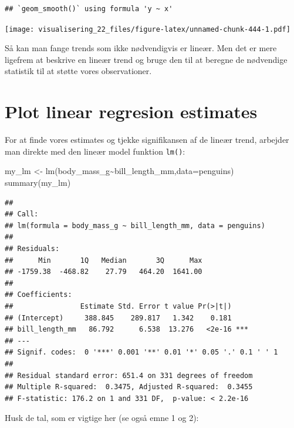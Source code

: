\documentclass[
]{book}
\newenvironment{Shaded}{\begin{snugshade}}{\end{snugshade}}
\newcommand{\AttributeTok}[1]{\textcolor[rgb]{0.77,0.63,0.00}{#1}}
\newcommand{\FunctionTok}[1]{\textcolor[rgb]{0.00,0.00,0.00}{#1}}
\newcommand{\NormalTok}[1]{#1}
\newcommand{\OtherTok}[1]{\textcolor[rgb]{0.56,0.35,0.01}{#1}}
\newcommand{\SpecialCharTok}[1]{\textcolor[rgb]{0.00,0.00,0.00}{#1}}
\begin{document}
\begin{verbatim}
## `geom_smooth()` using formula 'y ~ x'
\end{verbatim}

\texttt{[image: visualisering\_22\_files/figure-latex/unnamed-chunk-444-1.pdf]}

Så kan man fange trends som ikke nødvendigvis er lineær. Men det er mere ligefrem at beskrive en lineær trend og bruge den til at beregne de nødvendige statistik til at støtte vores observationer.

\hypertarget{plot-linear-regresion-estimates}{%
\section{Plot linear regresion estimates}\label{plot-linear-regresion-estimates}}

For at finde vores estimates og tjekke signifikansen af de lineær trend, arbejder man direkte med den lineær model funktion \texttt{lm()}:

\begin{Shaded}
\begin{Highlighting}[]
\NormalTok{my\_lm }\OtherTok{\textless{}{-}} \FunctionTok{lm}\NormalTok{(body\_mass\_g}\SpecialCharTok{\textasciitilde{}}\NormalTok{bill\_length\_mm,}\AttributeTok{data=}\NormalTok{penguins)}
\FunctionTok{summary}\NormalTok{(my\_lm)}
\end{Highlighting}
\end{Shaded}

\begin{verbatim}
## 
## Call:
## lm(formula = body_mass_g ~ bill_length_mm, data = penguins)
## 
## Residuals:
##      Min       1Q   Median       3Q      Max 
## -1759.38  -468.82    27.79   464.20  1641.00 
## 
## Coefficients:
##                Estimate Std. Error t value Pr(>|t|)    
## (Intercept)     388.845    289.817   1.342    0.181    
## bill_length_mm   86.792      6.538  13.276   <2e-16 ***
## ---
## Signif. codes:  0 '***' 0.001 '**' 0.01 '*' 0.05 '.' 0.1 ' ' 1
## 
## Residual standard error: 651.4 on 331 degrees of freedom
## Multiple R-squared:  0.3475, Adjusted R-squared:  0.3455 
## F-statistic: 176.2 on 1 and 331 DF,  p-value: < 2.2e-16
\end{verbatim}

Husk de tal, som er vigtige her (se også emne 1 og 2):
\end{document}

